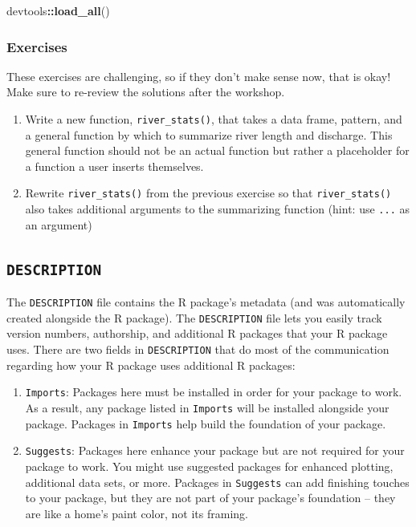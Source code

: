 \documentclass[
]{book}
\newenvironment{Shaded}{\begin{snugshade}}{\end{snugshade}}
\newcommand{\KeywordTok}[1]{\textcolor[rgb]{0.13,0.29,0.53}{\textbf{#1}}}
\newcommand{\NormalTok}[1]{#1}
\newcommand{\OperatorTok}[1]{\textcolor[rgb]{0.81,0.36,0.00}{\textbf{#1}}}
\begin{document}
\begin{Shaded}
\begin{Highlighting}[]
\NormalTok{devtools}\OperatorTok{::}\KeywordTok{load_all}\NormalTok{()}
\end{Highlighting}
\end{Shaded}

\hypertarget{ex-set3}{%
\subsubsection{Exercises}\label{ex-set3}}

These exercises are challenging, so if they don't make sense now, that is okay! Make sure to re-review the solutions after the workshop.

\begin{enumerate}
\def\labelenumi{\arabic{enumi}.}
\item
  Write a new function, \texttt{river\_stats()}, that takes a data frame, pattern, and a general function by which to summarize river length and discharge. This general function should not be an actual function but rather a placeholder for a function a user inserts themselves.
\item
  Rewrite \texttt{river\_stats()} from the previous exercise so that \texttt{river\_stats()} also takes additional arguments to the summarizing function (hint: use \texttt{...} as an argument)
\end{enumerate}

\hypertarget{description}{%
\subsection{\texorpdfstring{\texttt{DESCRIPTION}}{DESCRIPTION}}\label{description}}

The \texttt{DESCRIPTION} file contains the R package's metadata (and was automatically created alongside the R package). The \texttt{DESCRIPTION} file lets you easily track version numbers, authorship, and additional R packages that your R package uses. There are two fields in \texttt{DESCRIPTION} that do most of the communication regarding how your R package uses additional R packages:

\begin{enumerate}
\def\labelenumi{\arabic{enumi}.}
\item
  \texttt{Imports}: Packages here must be installed in order for your package to work. As a result, any package listed in \texttt{Imports} will be installed alongside your package. Packages in \texttt{Imports} help build the foundation of your package.
\item
  \texttt{Suggests}: Packages here enhance your package but are not required for your package to work. You might use suggested packages for enhanced plotting, additional data sets, or more. Packages in \texttt{Suggests} can add finishing touches to your package, but they are not part of your package's foundation -- they are like a home's paint color, not its framing.
\end{enumerate}
\end{document}
